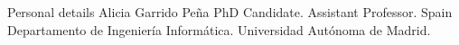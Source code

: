 \begin{rubric}{Personal details}
Alicia Garrido Peña
PhD Candidate. Assistant Professor.
Spain
Departamento de Ingeniería Informática. Universidad Autónoma de Madrid.

\end{rubric}